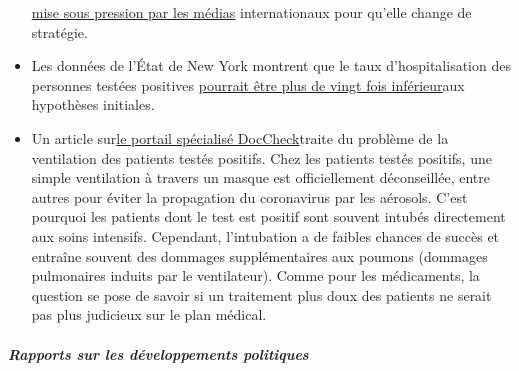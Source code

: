 \begin{itemize}
  \href{https://www.theguardian.com/world/2020/mar/30/catastrophe-sweden-coronavirus-stoicism-lockdown-europe}{mise
  sous pression par les médias} internationaux pour qu'elle change de
  stratégie.
\item
  Les données de l'État de New York montrent que le taux
  d'hospitalisation des personnes testées positives
  \href{https://www.nytimes.com/2020/03/27/nyregion/new-rochelle-coronavirus.html}{pourrait
  être plus de vingt fois inférieur}aux hypothèses initiales.
\item
  Un article
  sur\href{https://www.doccheck.com/de/detail/articles/26271-covid-19-beatmung-und-dann}{le
  portail spécialisé DocCheck}traite du problème de la ventilation des
  patients testés positifs. Chez les patients testés positifs, une
  simple ventilation à travers un masque est officiellement
  déconseillée, entre autres pour éviter la propagation du coronavirus
  par les aérosols. C'est pourquoi les patients dont le test est positif
  sont souvent intubés directement aux soins intensifs. Cependant,
  l'intubation a de faibles chances de succès et entraîne souvent des
  dommages supplémentaires aux poumons (dommages pulmonaires induits par
  le ventilateur). Comme pour les médicaments, la question se pose de
  savoir si un traitement plus doux des patients ne serait pas plus
  judicieux sur le plan médical.
\end{itemize}

\hypertarget{rapports-sur-les-duxe9veloppements-politiques}{%
\subparagraph{\texorpdfstring{\textbf{Rapports sur les développements
politiques}}{Rapports sur les développements politiques}}\label{rapports-sur-les-duxe9veloppements-politiques}}

